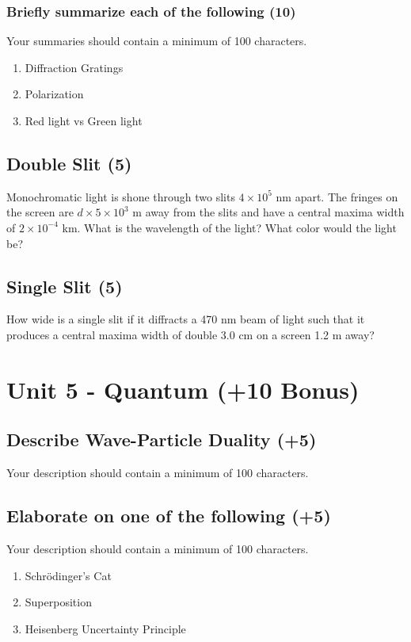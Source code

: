 \documentclass{article}
\begin{document}
\subsubsection{Briefly summarize each of the following (10)}
Your summaries should contain a minimum of 100 characters.
\begin{enumerate}[label=\alph*)]
    \item Diffraction Gratings
    \item Polarization
    \item Red light vs Green light
\end{enumerate}\leavevmode

\subsection{Double Slit (5)}
Monochromatic light is shone through two slits $4 \times 10^5$ nm apart. The fringes on the screen are $d \times 5 \times 10^3$ m away from the slits and have a central maxima width of $2 \times 10^{-4}$ km. What is the wavelength of the light? What color would the light be?

\subsection{Single Slit (5)}
How wide is a single slit if it diffracts a 470 nm beam of light such that it produces a central maxima width of double 3.0 cm on a screen 1.2 m away?\\

\section{Unit 5 - Quantum (+10 Bonus)}
\subsection{Describe Wave-Particle Duality (+5)}
Your description should contain a minimum of 100 characters.

\subsection{Elaborate on one of the following (+5)}
Your description should contain a minimum of 100 characters.
\begin{enumerate}[label=\alph*)]
    \item Schrödinger's Cat
    \item Superposition
    \item Heisenberg Uncertainty Principle
\end{enumerate}\leavevmode\\
\end{document}
